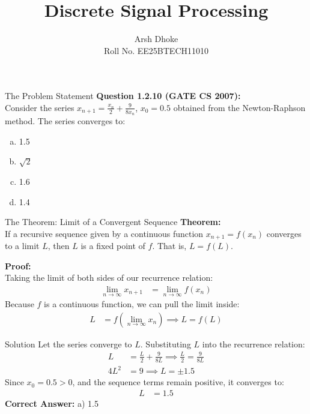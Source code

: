 \documentclass{beamer}
\title{Discrete Signal Processing}
\author{Arsh Dhoke \\ Roll No. EE25BTECH11010}
\date{}
\begin{document}
\frame{\titlepage}

\begin{frame}{The Problem Statement}
    \textbf{Question 1.2.10 (GATE CS 2007):}\\
    Consider the series $x_{n+1} = \frac{x_n}{2} + \frac{9}{8x_n}$, $x_0 = 0.5$ obtained from the Newton-Raphson method. The series converges to:
    \vspace{0.5cm}
    \begin{enumerate}[a)]
        \item 1.5
        \item $\sqrt{2}$
        \item 1.6
        \item 1.4
    \end{enumerate}
\end{frame}

\begin{frame}{The Theorem: Limit of a Convergent Sequence}
    \textbf{Theorem:}\\
    If a recursive sequence given by a continuous function $x_{n+1} = f(x_n)$ converges to a limit $L$, then $L$ is a fixed point of $f$. That is, $L = f(L)$.
    
    \vspace{0.3cm}
    \textbf{Proof:}\\
    Taking the limit of both sides of our recurrence relation:
    \begin{align*}
        \lim_{n \to \infty} x_{n+1} &= \lim_{n \to \infty} f(x_n)
    \end{align*}
    Because $f$ is a continuous function, we can pull the limit inside:
    \begin{align*}
        L &= f\left(\lim_{n \to \infty} x_n\right) \implies L = f(L) 
    \end{align*}
\end{frame}

\begin{frame}{Solution}
    Let the series converge to $L$. Substituting $L$ into the recurrence relation:
    \begin{align*}
        L &= \frac{L}{2} + \frac{9}{8L} \implies \frac{L}{2} = \frac{9}{8L} \\
        4L^2 &= 9 \implies L = \pm 1.5
    \end{align*}
    Since $x_0 = 0.5 > 0$, and the sequence terms remain positive, it converges to:
    \begin{align*}
        L &= 1.5
    \end{align*}
    \textbf{Correct Answer:} a) 1.5
\end{frame}
\end{document}
